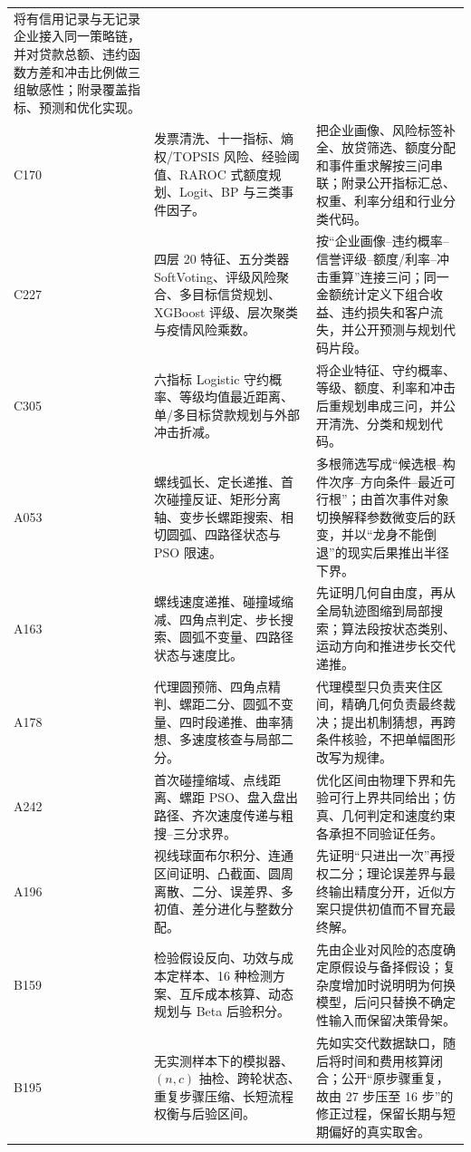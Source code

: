 \begin{longtable}{p{1.4cm}p{5.2cm}p{7.0cm}}
将有信用记录与无记录企业接入同一策略链，并对贷款总额、违约函数方差和冲击比例做三组敏感性；附录覆盖指标、预测和优化实现。\\
C170 & 发票清洗、十一指标、熵权/TOPSIS 风险、经验阈值、RAROC 式额度规划、Logit、BP 与三类事件因子。 &
把企业画像、风险标签补全、放贷筛选、额度分配和事件重求解按三问串联；附录公开指标汇总、权重、利率分组和行业分类代码。\\
C227 & 四层 20 特征、五分类器 SoftVoting、评级风险聚合、多目标信贷规划、XGBoost 评级、层次聚类与疫情风险乘数。 &
按“企业画像--违约概率--信誉评级--额度/利率--冲击重算”连接三问；同一金额统计定义下组合收益、违约损失和客户流失，并公开预测与规划代码片段。\\
C305 & 六指标 Logistic 守约概率、等级均值最近距离、单/多目标贷款规划与外部冲击折减。 &
将企业特征、守约概率、等级、额度、利率和冲击后重规划串成三问，并公开清洗、分类和规划代码。\\
A053 & 螺线弧长、定长递推、首次碰撞反证、矩形分离轴、变步长螺距搜索、相切圆弧、四路径状态与 PSO 限速。 &
多根筛选写成“候选根--构件次序--方向条件--最近可行根”；由首次事件对象切换解释参数微变后的跃变，并以“龙身不能倒退”的现实后果推出半径下界。\\
A163 & 螺线速度递推、碰撞域缩减、四角点判定、步长搜索、圆弧不变量、四路径状态与速度比。 &
先证明几何自由度，再从全局轨迹图缩到局部搜索；算法段按状态类别、运动方向和推进步长交代递推。\\
A178 & 代理圆预筛、四角点精判、螺距二分、圆弧不变量、四时段递推、曲率猜想、多速度核查与局部二分。 &
代理模型只负责夹住区间，精确几何负责最终裁决；提出机制猜想，再跨条件核验，不把单幅图形改写为规律。\\
A242 & 首次碰撞缩域、点线距离、螺距 PSO、盘入盘出路径、齐次速度传递与粗搜--三分求界。 &
优化区间由物理下界和先验可行上界共同给出；仿真、几何判定和速度约束各承担不同验证任务。\\
A196 & 视线球面布尔积分、连通区间证明、凸截面、圆周离散、二分、误差界、多初值、差分进化与整数分配。 &
先证明“只进出一次”再授权二分；理论误差界与最终输出精度分开，近似方案只提供初值而不冒充最终解。\\
B159 & 检验假设反向、功效与成本定样本、16 种检测方案、互斥成本核算、动态规划与 Beta 后验积分。 &
先由企业对风险的态度确定原假设与备择假设；复杂度增加时说明明为何换模型，后问只替换不确定性输入而保留决策骨架。\\
B195 & 无实测样本下的模拟器、$(n,c)$ 抽检、跨轮状态、重复步骤压缩、长短流程权衡与后验区间。 &
先如实交代数据缺口，随后将时间和费用核算闭合；公开“原步骤重复，故由 27 步压至 16 步”的修正过程，保留长期与短期偏好的真实取舍。\\

\end{longtable}
